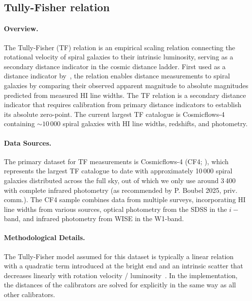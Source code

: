 \subsection{Tully-Fisher relation}

\paragraph{Overview.}
The Tully-Fisher (TF) relation is an empirical scaling relation connecting the rotational velocity of spiral galaxies to their intrinsic luminosity, serving as a secondary distance indicator in the cosmic distance ladder. First used as a distance indicator by~\citet{1977A&A....54..661T}, the relation enables distance measurements to spiral galaxies by comparing their observed apparent magnitude to absolute magnitudes predicted from measured HI line widths. The TF relation is a secondary distance indicator that requires calibration from primary distance indicators to establish its absolute zero-point. The current largest TF catalogue is Cosmicflows-4~\citep{2020ApJ...902..145K} containing $\sim 10\,000$ spiral galaxies with HI line widths, redshifts, and photometry.

\paragraph{Data Sources.}
The primary dataset for TF measurements is Cosmicflows-4 (CF4; \citealt{2020ApJ...902..145K}), which represents the largest TF catalogue to date with approximately 10\,000 spiral galaxies distributed across the full sky, out of which we only use around 3\,400 with complete infrared photometry (as recommended by P. Boubel 2025, priv. comm.). The CF4 sample combines data from multiple surveys, incorporating HI line widths from various sources, optical photometry from the SDSS in the $i-$band, and infrared photometry from WISE in the W1-band. 

\paragraph{Methodological Details.}
The Tully-Fisher model assumed for this dataset is typically a linear relation with a quadratic term introduced at the bright end and an intrinsic scatter that decreases linearly with rotation velocity / luminosity~\citep{2020ApJ...902..145K,2024MNRAS.531...84B}. In the {\DN} implementation, the distances of the calibrators are solved for explicitly in the same way as all other calibrators.

